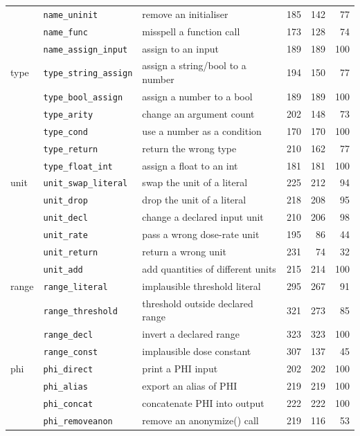 \documentclass[conference]{IEEEtran}
\begin{document}
\begin{table}[t]
\begin{tabular}{llp{5.2cm}rrr}
 & \texttt{name\_uninit} & remove an initialiser & 185 & 142 & 77\\
 & \texttt{name\_func} & misspell a function call & 173 & 128 & 74\\
 & \texttt{name\_assign\_input} & assign to an input & 189 & 189 & 100\\
\midrule
type & \texttt{type\_string\_assign} & assign a string/bool to a number & 194 & 150 & 77\\
 & \texttt{type\_bool\_assign} & assign a number to a bool & 189 & 189 & 100\\
 & \texttt{type\_arity} & change an argument count & 202 & 148 & 73\\
 & \texttt{type\_cond} & use a number as a condition & 170 & 170 & 100\\
 & \texttt{type\_return} & return the wrong type & 210 & 162 & 77\\
 & \texttt{type\_float\_int} & assign a float to an int & 181 & 181 & 100\\
\midrule
unit & \texttt{unit\_swap\_literal} & swap the unit of a literal & 225 & 212 & 94\\
 & \texttt{unit\_drop} & drop the unit of a literal & 218 & 208 & 95\\
 & \texttt{unit\_decl} & change a declared input unit & 210 & 206 & 98\\
 & \texttt{unit\_rate} & pass a wrong dose-rate unit & 195 & 86 & 44\\
 & \texttt{unit\_return} & return a wrong unit & 231 & 74 & 32\\
 & \texttt{unit\_add} & add quantities of different units & 215 & 214 & 100\\
\midrule
range & \texttt{range\_literal} & implausible threshold literal & 295 & 267 & 91\\
 & \texttt{range\_threshold} & threshold outside declared range & 321 & 273 & 85\\
 & \texttt{range\_decl} & invert a declared range & 323 & 323 & 100\\
 & \texttt{range\_const} & implausible dose constant & 307 & 137 & 45\\
\midrule
phi & \texttt{phi\_direct} & print a PHI input & 202 & 202 & 100\\
 & \texttt{phi\_alias} & export an alias of PHI & 219 & 219 & 100\\
 & \texttt{phi\_concat} & concatenate PHI into output & 222 & 222 & 100\\
 & \texttt{phi\_removeanon} & remove an anonymize() call & 219 & 116 & 53\\

\end{tabular}
\end{table}
\end{document}
